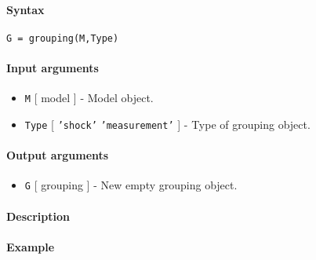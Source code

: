 


	\paragraph{Syntax}

\begin{verbatim}
G = grouping(M,Type)
\end{verbatim}

\paragraph{Input arguments}

\begin{itemize}
\item
  \texttt{M} {[} model {]} - Model object.
\item
  \texttt{Type} {[} \texttt{'shock'} \textbar{} \texttt{'measurement'}
  {]} - Type of grouping object.
\end{itemize}

\paragraph{Output arguments}

\begin{itemize}
\itemsep1pt\parskip0pt
\item
  \texttt{G} {[} grouping {]} - New empty grouping object.
\end{itemize}

\paragraph{Description}

\paragraph{Example}


